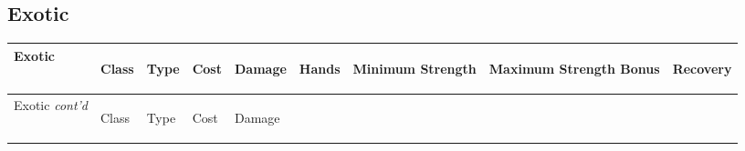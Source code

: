 \documentclass[twoside]{book}
\begin{document}
    

\subsection{Exotic}
    
\begin{longtable}{p{1.25in}llllp{2em}p{3em}p{3em}l} 
  Exotic
  &
  \begin{turn}{70}{Class}\end{turn}
          
  &
  \begin{turn}{70}{Type}\end{turn}
          
  &
  \begin{turn}{70}{Cost}\end{turn}
          
  &
  \begin{turn}{70}{Damage}\end{turn}
          
  &
  \begin{turn}{70}{Hands}\end{turn}
          
  &
  \begin{turn}{70}{Minimum Strength}\end{turn}
          
  &
  \begin{turn}{70}{Maximum Strength Bonus}\end{turn}
          
  &
  \begin{turn}{70}{Recovery}\end{turn}
          
  \\
  \hline
  \hline
  \endfirsthead
  Exotic \textit{cont'd}
        
  &
  \begin{turn}{70}{Class}\end{turn}
          
  &
  \begin{turn}{70}{Type}\end{turn}
          
  &
  \begin{turn}{70}{Cost}\end{turn}
          
  &
  \begin{turn}{70}{Damage}\end{turn}
          

\end{longtable}
\end{document}
